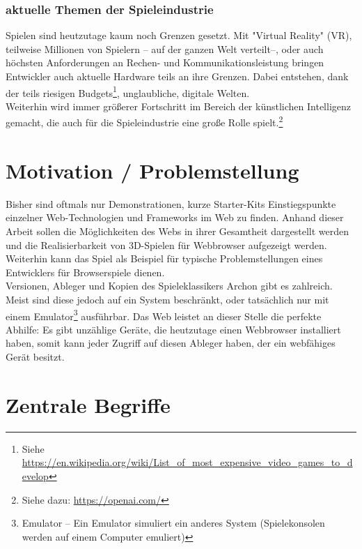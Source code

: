 \subsubsection{aktuelle Themen der Spieleindustrie}
Spielen sind heutzutage kaum noch Grenzen gesetzt. Mit "Virtual Reality" (VR), teilweise Millionen von Spielern -- auf der ganzen Welt verteilt--, oder auch höchsten Anforderungen an Rechen- und Kommunikationsleistung bringen Entwickler auch aktuelle Hardware teils an ihre Grenzen. Dabei entstehen, dank der teils riesigen Budgets\footnote{Siehe \url{https://en.wikipedia.org/wiki/List_of_most_expensive_video_games_to_develop}}, unglaubliche, digitale Welten.\\
Weiterhin wird immer größerer Fortschritt im Bereich der künstlichen Intelligenz gemacht, die auch für die Spieleindustrie eine große Rolle spielt.\footnote{Siehe dazu: \url{https://openai.com/}}
\section{Motivation / Problemstellung}
\label{sec:motivation}
Bisher sind oftmals nur Demonstrationen, kurze Starter-Kits \bzw Einstiegspunkte einzelner Web-Technologien und Frameworks im Web zu finden. Anhand dieser Arbeit sollen die Möglichkeiten des Webs in ihrer Gesamtheit dargestellt werden und die Realisierbarkeit von 3D-Spielen für Webbrowser aufgezeigt werden. Weiterhin kann das Spiel als Beispiel für typische Problemstellungen eines Entwicklers für Browserspiele dienen.\\
Versionen, Ableger und Kopien des Spieleklassikers Archon gibt es zahlreich. Meist sind diese jedoch auf ein System beschränkt, oder tatsächlich nur mit einem Emulator\footnote{Emulator -- Ein Emulator simuliert ein anderes System (\zB Spielekonsolen werden auf einem Computer emuliert)} ausführbar. Das Web leistet an dieser Stelle die perfekte Abhilfe: Es gibt unzählige Geräte, die heutzutage einen Webbrowser installiert haben, somit kann jeder Zugriff auf diesen Ableger haben, der ein webfähiges Gerät besitzt.
\clearpage
\section{Zentrale Begriffe}
\label{sec:zentrale_begriffe}
